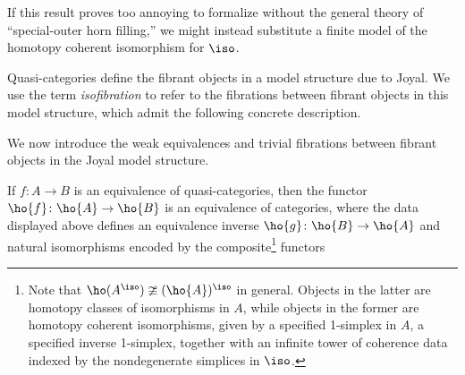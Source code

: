 \begin{rmk}
If this result proves too annoying to formalize without the general theory of ``special-outer horn filling,'' we might instead substitute a finite model of the homotopy coherent isomorphism for $\iso$.
\end{rmk}



Quasi-categories define the fibrant objects in a model structure due to Joyal. We use the term \emph{isofibration} to refer to the fibrations between fibrant objects in this model structure, which admit the following concrete description.


We now introduce the weak equivalences and trivial fibrations between fibrant objects in the Joyal model structure.


  \begin{lemma}\label{lem:qcat-htpy-cat-equiv}
    If $f \colon A \to B$ is an equivalence of quasi-categories, then the functor $\ho{f} \colon \ho{A} \to \ho{B}$ is an equivalence of categories, where the data displayed above defines an equivalence inverse $\ho{g} \colon \ho{B} \to \ho{A}$ and natural isomorphisms encoded by the composite\footnote{Note that $\ho(A^\iso) \ncong (\ho{A})^\iso$ in general. Objects in the latter are homotopy classes of isomorphisms in $A$, while objects in the former are homotopy coherent isomorphisms, given by a specified 1-simplex in $A$, a specified inverse 1-simplex, together with an infinite tower of coherence data indexed by the nondegenerate simplices in $\iso$.} functors
  \begin{center} 
  \end{center}
  \end{lemma}



